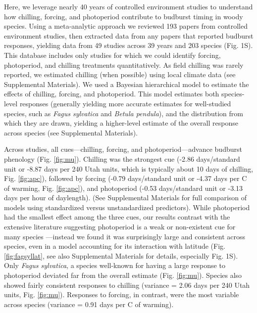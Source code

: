 \documentclass{article}
\begin{document}
\par Here, we leverage nearly 40 years of controlled environment studies to understand how chilling, forcing, and photoperiod contribute to budburst timing in woody species. Using a meta-analytic approach we reviewed 193 papers from controlled environment studies, then extracted data from any papers that reported budburst responses, yielding data from 49 studies across 39 years and 203 species (Fig. 1S). This database includes only studies for which we could identify forcing, photoperiod, and chilling treatments quantitatively. As field chilling was rarely reported, we estimated chilling (when possible) using local climate data (see Supplemental Materials). We used a Bayesian hierarchical model to estimate the effects of chilling, forcing, and photoperiod. This model estimates both species-level responses (generally yielding more accurate estimates for well-studied species, such as \emph{Fagus sylvatica} and \emph{Betula pendula}), and the distribution from which they are drawn, yielding a higher-level estimate of the overall response across species (see Supplemental Materials).

\par Across studies, all cues---chilling, forcing, and photoperiod---advance budburst phenology (Fig. \ref {fig:mu}). Chilling was the strongest cue (-2.86 days/standard unit or -8.87 days per 240 Utah units, which is typically about 10 days of chilling, %
Fig. \ref {fig:apc}), followed by forcing (-0.79 days/standard unit or -4.37 days per \degree C of warming, Fig. \ref {fig:apc}), and photoperiod (-0.53 days/standard unit or -3.13 days per hour of daylength). (See Supplemental Materials for full comparison of models using standardized versus unstandardized predictors). While photoperiod had the smallest effect among the three cues, our results contrast with the extensive literature suggesting photoperiod is a weak or non-existent cue for many species \citep{zohner2016,koerner2010a}---instead we found it was surprisingly large and consistent across species, even in a model accounting for its interaction with latitude (Fig. \ref {fig:fagsyllat}, see also Supplemental Materials for details, especially Fig. 1S). Only \emph{Fagus sylvatica}, a species well-known for having a large response to photoperiod deviated far from the overall estimate (Fig. \ref {fig:mu}). Species also showed fairly consistent responses to chilling (variance = 2.06 days per 240 Utah units, Fig. \ref {fig:mu}).
Responses to forcing, in contrast, were the most variable across species (variance = 0.91 days per \degree C of warming).
\end{document}
